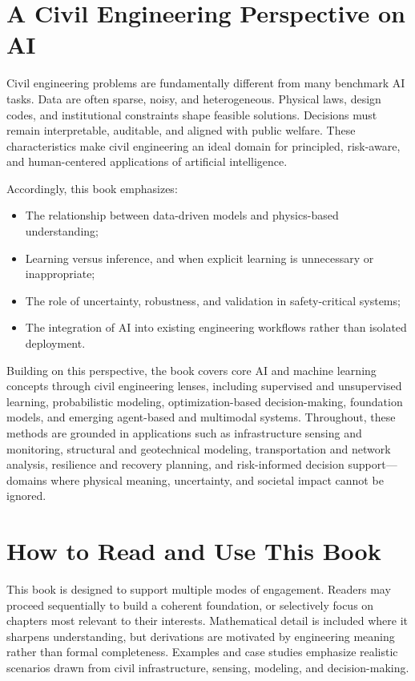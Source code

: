 \documentclass[12pt]{article}
\begin{document}
\section*{A Civil Engineering Perspective on AI}

Civil engineering problems are fundamentally different from many benchmark AI tasks. Data are often sparse, noisy, and heterogeneous. Physical laws, design codes, and institutional constraints shape feasible solutions. Decisions must remain interpretable, auditable, and aligned with public welfare. These characteristics make civil engineering an ideal domain for principled, risk-aware, and human-centered applications of artificial intelligence.

Accordingly, this book emphasizes:
\begin{itemize}
\item The relationship between data-driven models and physics-based understanding;
\item Learning versus inference, and when explicit learning is unnecessary or inappropriate;
\item The role of uncertainty, robustness, and validation in safety-critical systems;
\item The integration of AI into existing engineering workflows rather than isolated deployment.
\end{itemize}

Building on this perspective, the book covers core AI and machine learning concepts through civil engineering lenses, including supervised and unsupervised learning, probabilistic modeling, optimization-based decision-making, foundation models, and emerging agent-based and multimodal systems. Throughout, these methods are grounded in applications such as infrastructure sensing and monitoring, structural and geotechnical modeling, transportation and network analysis, resilience and recovery planning, and risk-informed decision support—domains where physical meaning, uncertainty, and societal impact cannot be ignored.

\section*{How to Read and Use This Book}

This book is designed to support multiple modes of engagement. Readers may proceed sequentially to build a coherent foundation, or selectively focus on chapters most relevant to their interests. Mathematical detail is included where it sharpens understanding, but derivations are motivated by engineering meaning rather than formal completeness. Examples and case studies emphasize realistic scenarios drawn from civil infrastructure, sensing, modeling, and decision-making.
\end{document}
